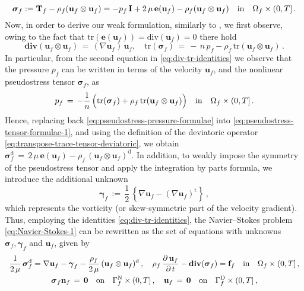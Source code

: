 \documentclass[11pt]{article}
\numberwithin{equation}{section}
\newcommand{\ds}{\displaystyle}
\newcommand{\bgamma}{{\boldsymbol\gamma}}
\newcommand{\bsi}{{\boldsymbol\sigma}}
\newcommand{\f}{\mathbf{f}}
\newcommand{\bu}{\mathbf{u}}
\newcommand{\bn}{{\mathbf{n}}}
\newcommand{\be}{{\mathbf{e}}}
\newcommand{\0}{{\mathbf{0}}}
\def\bI{\mathbf{I}}
\def\bT{\mathbf{T}}
\def\rd{\mathrm{d}}
\def\rD{\mathrm{D}}
\def\rN{\mathrm{N}}
\def\rt{\mathrm{t}}
\def\bdiv{\mathbf{div}}
\def\tr{\mathrm{tr}}
\def\div{\mathrm{div}}
\def\qin{{\quad\hbox{in}\quad}}
\def\qon{{\quad\hbox{on}\quad}}
\numberwithin{equation}{section}
\begin{document}
\begin{equation}\label{eq:pseudostress-tensor-formulae-1}
\bsi_f := \bT_f - \rho_f(\bu_f\otimes\bu_f) = -p_f\,\bI + 2\,\mu\,\be(\bu_f) - \rho_f(\bu_f\otimes \bu_f) \qin \Omega_f\times (0,T]\,.
\end{equation}
Now, in order to derive our weak formulation, similarly to \cite{cgot2016,cgos2017}, we first observe, owing to the fact that $\tr(\be(\bu_f)) = \div(\bu_f) = 0$ there hold
\begin{equation}\label{eq:div-tr-identities}
\bdiv(\bu_f\otimes\bu_f) \,=\, (\nabla\bu_f)\,\bu_f,\quad
\tr(\bsi_f) \,=\, -\,n\,p_f - \rho_f\,\tr(\bu_f\otimes\bu_f)\,.
\end{equation}
In particular, from the second equation in \eqref{eq:div-tr-identities} we observe that the pressure $p_f$ can be written in terms of the velocity $\bu_f$, and the nonlinear pseudostress tensor $\bsi_f$, as
\begin{equation}\label{eq:pseudostress-pressure-formulae}
p_f \,=\, -\frac{1}{n}\,\Big( \tr(\bsi_f) + \rho_f\,\tr(\bu_f\otimes\bu_f) \Big)  \qin \Omega_f\times (0,T] \,.
\end{equation}
%
Hence, replacing back \eqref{eq:pseudostress-pressure-formulae} into \eqref{eq:pseudostress-tensor-formulae-1}, and using the definition of the deviatoric operator \eqref{eq:transpose-trace-tensor-deviatoric}, we obtain
$\bsi^\rd_f \,=\, 2\,\mu\,\be(\bu_f) - \rho_f\,(\bu_f\otimes\bu_f)^\rd$.
In addition, to weakly impose the symmetry of the pseudostress tensor and apply the integration by parts formula, we introduce the additional unknown
\begin{equation*}
\bgamma_f \,:=\, \frac{1}{2}\,\left\{ \nabla\bu_f - (\nabla\bu_f)^\rt \right\}\,,
\end{equation*}
which represents the vorticity (or skew-symmetric part of the velocity gradient). 
Thus, employing the identities \eqref{eq:div-tr-identities}, the Navier--Stokes problem \eqref{eq:Navier-Stokes-1} can be rewritten as the set of equations with unknowns $\bsi_f, \bgamma_f$ and $\bu_f$, given by
\begin{equation}\label{eq:Navier-Stokes-3}
\begin{array}{c}
\ds \frac{1}{2\,\mu}\,\bsi^\rd_f = \nabla\bu_f - \bgamma_f - \frac{\rho_f}{2\,\mu}\,(\bu_f\otimes\bu_f)^\rd \,,\quad 
\rho_f\,\frac{\partial\,\bu_f}{\partial\,t} - \bdiv(\bsi_f) = \f_f \qin \Omega_f\times (0,T] \,, \\[2ex]
\ds \bsi_f\bn_f \,=\, \0 \qon \Gamma^\rN_f\times (0,T] \,,\quad 
\bu_f \,=\, \0 \qon \Gamma^\rD_f\times (0,T]\,,
\end{array}
\end{equation}
\end{document}
